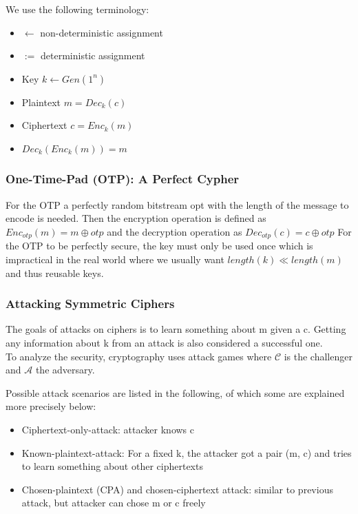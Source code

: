 We use the following terminology:
\begin{itemize}[noitemsep, topsep=0pt]
  \item $\leftarrow$ non-deterministic assignment
  \item $:=$ deterministic assignment
  \item Key $k \leftarrow Gen(1^n)$
  \item Plaintext $m = Dec_k(c)$
  \item Ciphertext $c = Enc_k(m)$
  \item $Dec_k(Enc_k(m)) = m$
\end{itemize}

\subsubsection{One-Time-Pad (OTP): A Perfect Cypher}
For the OTP a perfectly random bitstream opt with the length of the message to encode is needed.
Then the encryption operation is defined as $Enc_{otp}(m) = m \oplus otp$ and the decryption operation as $Dec_{otp}(c) = c \oplus otp$
For the OTP to be perfectly secure, the key must only be used once which is impractical in the real world where we usually want $length(k) \ll length(m)$ and thus reusable keys.

\subsubsection{Attacking Symmetric Ciphers}
The goals of attacks on ciphers is to learn something about m given a c.
Getting any information about k from an attack is also considered a successful one.\\

To analyze the security, cryptography uses attack games where $\mathcal{C}$ is the challenger and $\mathcal{A}$ the adversary.

Possible attack scenarios are listed in the following, of which some are explained more precisely below:
\begin{itemize}[noitemsep, topsep=0pt]
  \item Ciphertext-only-attack: attacker knows c
  \item Known-plaintext-attack: For a fixed k, the attacker got a pair (m, c) and tries to learn something about other ciphertexts
  \item Chosen-plaintext (CPA) and chosen-ciphertext attack: similar to previous attack, but attacker can chose m or c freely
\end{itemize}
\vspace{10pt}

